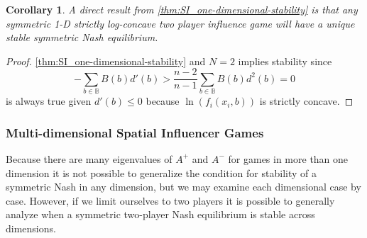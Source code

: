 \documentclass{article}
\newtheorem{corollary}{Corollary}[theorem]
\newcommand {\B}{\mathbb{B}}
\begin{document}
                \begin{corollary}
                    A direct result from \cref{thm:SI_one-dimensional-stability} is that any symmetric 1-D strictly log-concave two player influence game will have a unique stable symmetric Nash equilibrium. 
                \end{corollary}
                \begin{proof}
                    \cref{thm:SI_one-dimensional-stability} and $N=2$ implies stability since
                    \begin{equation}
                          -\sum_{b\in \B} B(b)d'(b)>\frac{n-2}{n-1}\sum_{b\in \B} B(b)d^2(b)=0
                    \end{equation}
                    is always true given $d'(b)\leq 0$ because $\ln(f_i(x_i,b))$ is strictly concave. 
                \end{proof}
            \subsubsection{Multi-dimensional Spatial Influencer Games}
                Because there are many eigenvalues of $A^+$ and $A^-$ for games in more than one dimension it is not possible to generalize the condition for stability of a symmetric Nash in any dimension, but we may examine each dimensional case by case. However, if we limit ourselves to two players it is possible to generally analyze when a symmetric two-player Nash equilibrium is stable across dimensions.
                
\end{document}
